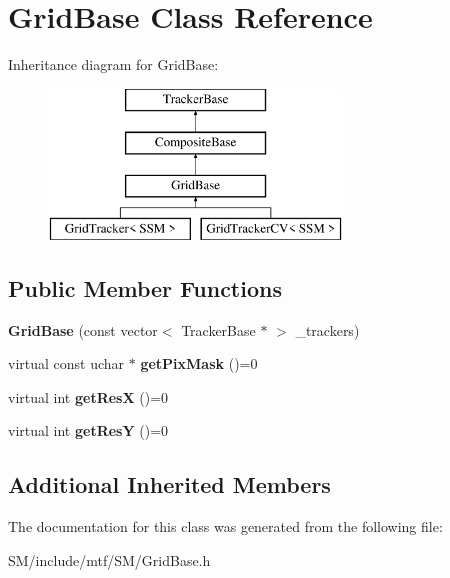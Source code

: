 \hypertarget{classGridBase}{\section{Grid\-Base Class Reference}
\label{classGridBase}
}
Inheritance diagram for Grid\-Base\-:\begin{figure}[H]
\begin{center}
\leavevmode
\includegraphics[height=4.000000cm]{classGridBase}
\end{center}
\end{figure}
\subsection*{Public Member Functions}
\begin{DoxyCompactItemize}
\item 
\hypertarget{classGridBase_af165e20266a2dded0102bdeefae83c24}{{\bfseries Grid\-Base} (const vector$<$ Tracker\-Base $\ast$ $>$ \-\_\-trackers)}\label{classGridBase_af165e20266a2dded0102bdeefae83c24}

\item 
\hypertarget{classGridBase_a7f30bfa6984c94af44ed156e4a294c3f}{virtual const uchar $\ast$ {\bfseries get\-Pix\-Mask} ()=0}\label{classGridBase_a7f30bfa6984c94af44ed156e4a294c3f}

\item 
\hypertarget{classGridBase_a6d3d5661688161ef6f5e0acc66572af2}{virtual int {\bfseries get\-Res\-X} ()=0}\label{classGridBase_a6d3d5661688161ef6f5e0acc66572af2}

\item 
\hypertarget{classGridBase_a3a72f50590abc5c17f4eeef62b664e23}{virtual int {\bfseries get\-Res\-Y} ()=0}\label{classGridBase_a3a72f50590abc5c17f4eeef62b664e23}

\end{DoxyCompactItemize}
\subsection*{Additional Inherited Members}


The documentation for this class was generated from the following file\-:\begin{DoxyCompactItemize}
\item 
S\-M/include/mtf/\-S\-M/Grid\-Base.\-h\end{DoxyCompactItemize}
